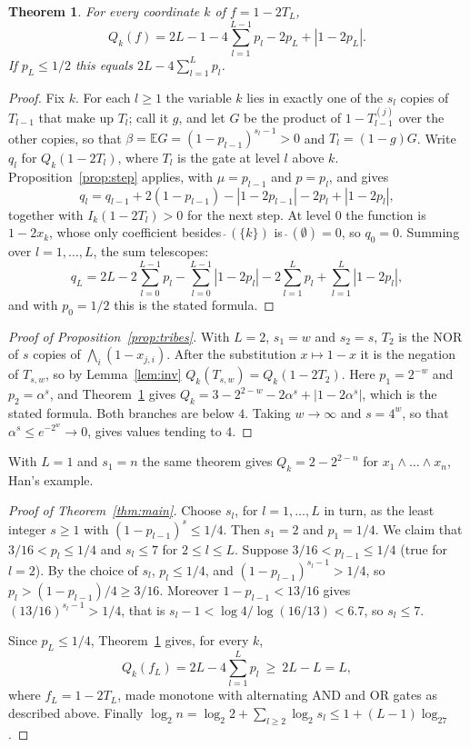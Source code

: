 \documentclass[11pt]{amsart}
\newtheorem{theorem}{Theorem}[section]
\theoremstyle{definition}\newtheorem{definition}[theorem]{Definition}
\theoremstyle{remark}\newtheorem{remark}[theorem]{Remark}
\newcommand{\E}{\mathbb{E}}
\begin{document}
\begin{theorem}\label{thm:closed}
For every coordinate $k$ of $f=1-2T_L$,
\[
Q_k(f)=2L-1-4\sum_{l=1}^{L-1}p_l-2p_L+|1-2p_L| .
\]
If $p_L\le1/2$ this equals $2L-4\sum_{l=1}^Lp_l$.
\end{theorem}

\begin{proof}
Fix $k$. For each $l\ge1$ the variable $k$ lies in exactly one of the $s_l$ copies of $T_{l-1}$ that make up $T_l$;
call it $g$, and let $G$ be the product of $1-T_{l-1}^{(j)}$ over the other copies, so that
$\beta=\E G=(1-p_{l-1})^{s_l-1}>0$ and $T_l=(1-g)G$. Write $q_l$ for $Q_k(1-2T_l)$, where $T_l$ is the gate at level
$l$ above $k$. Proposition~\ref{prop:step} applies, with $\mu=p_{l-1}$ and $p=p_l$, and gives
\[
q_l=q_{l-1}+2(1-p_{l-1})-|1-2p_{l-1}|-2p_l+|1-2p_l| ,
\]
together with $I_k(1-2T_l)>0$ for the next step. At level $0$ the function is $1-2x_k$, whose only coefficient besides
$\widehat{\ }(\{k\})$ is $\widehat{\ }(\emptyset)=0$, so $q_0=0$. Summing over $l=1,\dots,L$, the sum telescopes:
\[
q_L=2L-2\sum_{l=0}^{L-1}p_l-\sum_{l=0}^{L-1}|1-2p_l|-2\sum_{l=1}^Lp_l+\sum_{l=1}^L|1-2p_l| ,
\]
and with $p_0=1/2$ this is the stated formula.
\end{proof}

\begin{proof}[Proof of Proposition~\ref{prop:tribes}]
With $L=2$, $s_1=w$ and $s_2=s$, $T_2$ is the NOR of $s$ copies of $\bigwedge_i(1-x_{j,i})$. After the substitution
$x\mapsto1-x$ it is the negation of $T_{s,w}$, so by Lemma~\ref{lem:inv} $Q_k(T_{s,w})=Q_k(1-2T_2)$. Here
$p_1=2^{-w}$ and $p_2=\alpha^s$, and Theorem~\ref{thm:closed} gives
$Q_k=3-2^{2-w}-2\alpha^s+|1-2\alpha^s|$, which is the stated formula. Both branches are below $4$. Taking $w\to\infty$
and $s=4^w$, so that $\alpha^s\le e^{-2^w}\to0$, gives values tending to $4$.
\end{proof}

With $L=1$ and $s_1=n$ the same theorem gives $Q_k=2-2^{2-n}$ for $x_1\wedge\dots\wedge x_n$, Han's example.

\begin{proof}[Proof of Theorem~\ref{thm:main}]
Choose $s_l$, for $l=1,\dots,L$ in turn, as the least integer $s\ge1$ with $(1-p_{l-1})^s\le1/4$. Then $s_1=2$ and
$p_1=1/4$. We claim that $3/16<p_l\le1/4$ and $s_l\le7$ for $2\le l\le L$. Suppose $3/16<p_{l-1}\le1/4$ (true for
$l=2$). By the choice of $s_l$, $p_l\le1/4$, and $(1-p_{l-1})^{s_l-1}>1/4$, so
$p_l>(1-p_{l-1})/4\ge3/16$. Moreover $1-p_{l-1}<13/16$ gives $(13/16)^{s_l-1}>1/4$, that is
$s_l-1<\log4/\log(16/13)<6.7$, so $s_l\le7$.

Since $p_L\le1/4$, Theorem~\ref{thm:closed} gives, for every $k$,
\[
Q_k(f_L)=2L-4\sum_{l=1}^Lp_l\ \ge\ 2L-L=L ,
\]
where $f_L=1-2T_L$, made monotone with alternating AND and OR gates as described above. Finally
$\log_2n=\log_2 2+\sum_{l\ge2}\log_2s_l\le1+(L-1)\log_27$.
\end{proof}
\end{document}
